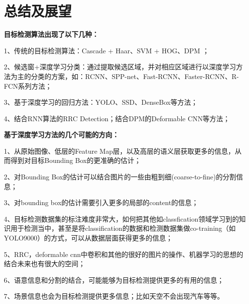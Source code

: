 \section{总结及展望}
\setcounter{figure}{0}
\textbf{目标检测算法出现了以下几种：}

1、传统的目标检测算法：Cascade\cite{repid} + Haar\cite{haar}、SVM\cite{svm} + HOG、DPM ；

2、候选窗+深度学习分类：通过提取候选区域，并对相应区域进行以深度学习方法为主的分类的方案，如：RCNN、SPP-net、Fast-RCNN、Faster-RCNN、R-FCN\cite{rfcn}系列方法；

3、基于深度学习的回归方法：YOLO、SSD、DenseBox\cite{densebox}等方法；

4、结合RNN算法的RRC Detection；结合DPM的Deformable CNN\cite{deformable}等方法；

\textbf{基于深度学习方法的几个可能的方向：}

1、从原始图像、低层的Feature Map层，以及高层的语义层获取更多的信息，从而得到对目标Bounding Box的更准确的估计；

2、对Bounding Box的估计可以结合图片的一些由粗到细(coarse-to-fine)的分割信息；

3、对bounding box的估计需要引入更多的局部的content的信息；

4、目标检测数据集的标注难度非常大，如何把其他如classfication领域学习到的知识用于检测当中，甚至是将classification的数据和检测数据集做co-training（如YOLO9000）的方式，可以从数据层面获得更多的信息；

5、RRC，deformable cnn中卷积和其他的很好的图片的操作、机器学习的思想的结合未来也有很大的空间；

6、语意信息和分割的结合，可能能够为目标检测提供更多的有用的信息；

7、场景信息也会为目标检测提供更多信息；比如天空不会出现汽车等等。